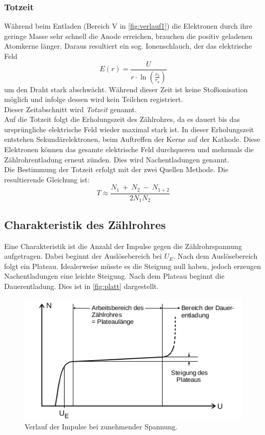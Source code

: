 \subsubsection{Totzeit}
Während beim Entladen (Bereich V in \ref{fig:verlauf1}) die Elektronen durch ihre geringe Masse sehr schnell die Anode erreichen, brauchen die positiv geladenen Atomkerne länger.
Daraus resultiert ein sog. Ionenschlauch, der das elektrische Feld
\begin{equation}
    E\left(r\right) = \frac{U}{r\cdot \ln\left(\frac{r_k}{r_a}\right)}
\end{equation}
um den Draht stark abschwächt.
Während dieser Zeit ist keine Stoßionisation möglich und infolge dessen wird kein Teilchen registriert.\\
Dieser Zeitabschnitt wird \textit{Totzeit} genannt.\\
Auf die Totzeit folgt die Erholungszeit des Zählrohres, da es dauert bis das ursprüngliche elektrische Feld wieder maximal stark ist.
In dieser Erholungszeit entstehen Sekundärelektronen, beim Auftreffen der Kerne auf der Kathode.
Diese Elektronen können das gesamte elektrische Feld durchqueren und mehrmals die Zählrohrentladung erneut zünden.
Dies wird Nachentladungen genannt.\\
Die Bestimmung der Totzeit erfolgt mit der zwei Quellen Methode.
Die resultierende Gleichung ist:
\begin{equation}
    T \approx \frac{N_1\ +\ N_2\ -\ N_{1+2}}{2N_1N_2}
    \label{eq:tot}
\end{equation}

\subsection{Charakteristik des Zählrohres}
Eine Charakteristik ist die Anzahl der Impulse gegen die Zählrohrspannung aufgetragen.
Dabei beginnt der Auslösebereich bei $U_E$.
Nach dem Auslösebereich folgt ein Plateau.
Idealerweise müsste es die Steigung null haben, jedoch erzeugen Nachentladungen eine leichte Steigung.
Nach dem Plateau beginnt die Dauerentladung.
Dies ist in \autoref{fig:platt} dargestellt.

\begin{figure}[htbp]
    \centering
    \includegraphics[scale=0.7]{Pics/charakter.png}
    \caption{Verlauf der Impulse bei zunehmender Spannung.}
    \label{fig:platt}
\end{figure}

